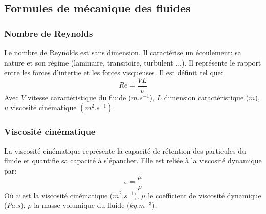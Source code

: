 \documentclass[10pt,a4paper]{article}
\begin{document}
\subsection{Formules de mécanique des fluides}
\subsubsection{Nombre de Reynolds\cite{nbreynolds}}
Le nombre de Reynolds est sans dimension. Il caractérise un écoulement: sa nature et son régime (laminaire, transitoire, turbulent ...). Il représente le rapport entre les forces d'intertie et les forces visqueuses. Il est définit tel que:
\begin{equation}
Re = \frac{VL}{\upsilon}
\end{equation}
Avec $V$ vitesse caractéristique du fluide ($m.s^{-1}$), $L$ dimension caractéristique ($m$), $\upsilon$ viscosité cinématique $(m^{2}.s^{-1})$.

\subsubsection{Viscosité cinématique\cite{viscocinema}}
La viscosité cinématique représente la capacité de rétention des particules du fluide et quantifie sa capacité à s'épancher. Elle est reliée à la viscosité dynamique par:
\begin{equation}
\upsilon = \frac{\mu}{\rho}
\end{equation}
Où $\upsilon$ est la viscosité cinématique ($m^{2}.s^{-1}$), $\mu$ le coefficient de viscosité dynamique ($Pa.s$), $\rho$ la masse volumique du fluide ($kg.m^{-3}$).

\end{document}
